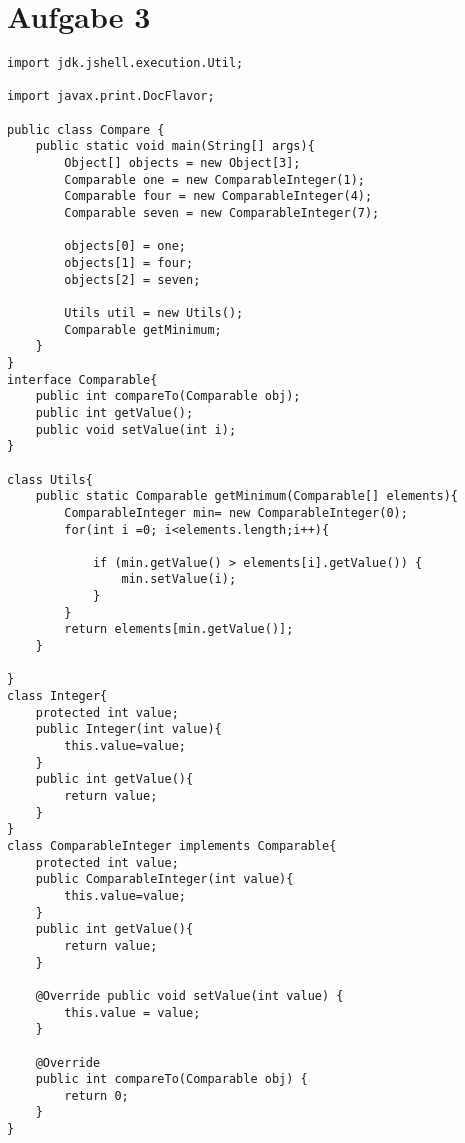 \documentclass[12pt,a4paper,oneside,ngerman]{article}
\begin{document}
\section{Aufgabe 3}
\begin {lstlisting}
import jdk.jshell.execution.Util;

import javax.print.DocFlavor;

public class Compare {
    public static void main(String[] args){
        Object[] objects = new Object[3];
        Comparable one = new ComparableInteger(1);
        Comparable four = new ComparableInteger(4);
        Comparable seven = new ComparableInteger(7);

        objects[0] = one;
        objects[1] = four;
        objects[2] = seven;

        Utils util = new Utils();
        Comparable getMinimum;
    }
}
interface Comparable{
    public int compareTo(Comparable obj);
    public int getValue();
    public void setValue(int i);
}

class Utils{
    public static Comparable getMinimum(Comparable[] elements){
        ComparableInteger min= new ComparableInteger(0);
        for(int i =0; i<elements.length;i++){

            if (min.getValue() > elements[i].getValue()) {
                min.setValue(i);
            }
        }
        return elements[min.getValue()];
    }

}
class Integer{
    protected int value;
    public Integer(int value){
        this.value=value;
    }
    public int getValue(){
        return value;
    }
}
class ComparableInteger implements Comparable{
    protected int value;
    public ComparableInteger(int value){
        this.value=value;
    }
    public int getValue(){
        return value;
    }

    @Override public void setValue(int value) {
        this.value = value;
    }

    @Override
    public int compareTo(Comparable obj) {
        return 0;
    }
}
\end{lstlisting}
\end{document}
